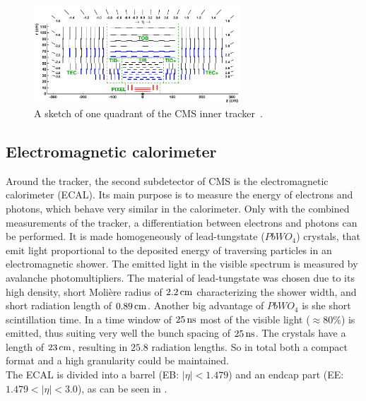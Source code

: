 \begin{figure}[tbp]
 \centering
 \includegraphics[width=0.69\textwidth]{figures/general/tracker.pdf}
 \caption{A sketch of one quadrant of the CMS inner tracker~\cite{TrackerPDFPic}.}
 \label{fig:tracker}
\end{figure}

\subsection{Electromagnetic calorimeter}
Around the tracker, the second subdetector of CMS is the electromagnetic calorimeter (ECAL). Its main purpose is to measure the energy of electrons and photons, which behave very similar in the calorimeter. Only with the combined measurements of the tracker, a differentiation between electrons and photons can be performed. It is made homogeneously of lead-tungstate ($PbWO_4$) crystals, that emit light proportional to the deposited energy of traversing particles in an electromagnetic shower. The emitted light in the visible spectrum is measured by avalanche photomultipliers. The material of lead-tungstate was chosen due to its high density, short Moli\`{e}re radius of $2.2\,\text{cm}$ characterizing the shower width, and short radiation length of $0.89\,\text{cm}$. Another big advantage of $PbWO_4$ is she short scintillation time. In a time window of $25\,\text{ns}$ most of the visible light ($\approx80\%$) is emitted, thus suiting very well the bunch spacing of $25\,\text{ns}$. The crystals have a length of $23\,\text{cm}$, resulting in $25.8$ radiation lengths. So in total both a compact format and a high granularity could be maintained.\\
The ECAL is divided into a barrel (EB: $|\eta|<1.479$) and an endcap part (EE: $1.479<|\eta|<3.0$), as can be seen in .
